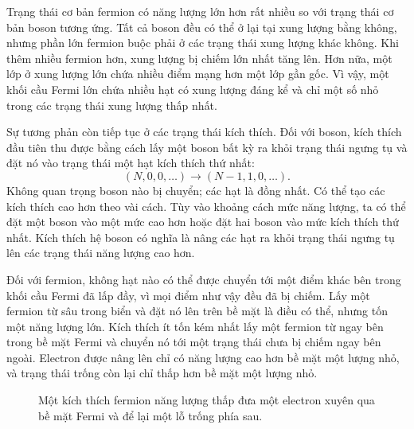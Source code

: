 Trạng thái cơ bản fermion có năng lượng lớn hơn rất nhiều so với trạng thái cơ bản boson tương ứng. Tất cả boson đều có thể ở lại tại xung lượng bằng không, nhưng phần lớn fermion buộc phải ở các trạng thái xung lượng khác không. Khi thêm nhiều fermion hơn, xung lượng bị chiếm lớn nhất tăng lên. Hơn nữa, một lớp ở xung lượng lớn chứa nhiều điểm mạng hơn một lớp gần gốc. Vì vậy, một khối cầu Fermi lớn chứa nhiều hạt có xung lượng đáng kể và chỉ một số nhỏ trong các trạng thái xung lượng thấp nhất.

Sự tương phản còn tiếp tục ở các trạng thái kích thích. Đối với boson, kích thích đầu tiên thu được bằng cách lấy một boson bất kỳ ra khỏi trạng thái ngưng tụ và đặt nó vào trạng thái một hạt kích thích thứ nhất:
\begin{equation}
(N,0,0,\ldots)\longrightarrow (N-1,1,0,\ldots).
\end{equation}
Không quan trọng boson nào bị chuyển; các hạt là đồng nhất. Có thể tạo các kích thích cao hơn theo vài cách. Tùy vào khoảng cách mức năng lượng, ta có thể đặt một boson vào một mức cao hơn hoặc đặt hai boson vào mức kích thích thứ nhất. Kích thích hệ boson có nghĩa là nâng các hạt ra khỏi trạng thái ngưng tụ lên các trạng thái năng lượng cao hơn.

Đối với fermion, không hạt nào có thể được chuyển tới một điểm khác bên trong khối cầu Fermi đã lấp đầy, vì mọi điểm như vậy đều đã bị chiếm. Lấy một fermion từ sâu trong biển và đặt nó lên trên bề mặt là điều có thể, nhưng tốn một năng lượng lớn. Kích thích ít tốn kém nhất lấy một fermion từ ngay bên trong bề mặt Fermi và chuyển nó tới một trạng thái chưa bị chiếm ngay bên ngoài. Electron được nâng lên chỉ có năng lượng cao hơn bề mặt một lượng nhỏ, và trạng thái trống còn lại chỉ thấp hơn bề mặt một lượng nhỏ.

\begin{figure}
\centering
{}
\caption{Một kích thích fermion năng lượng thấp đưa một electron xuyên qua bề mặt Fermi và để lại một lỗ trống phía sau.}
\end{figure}

